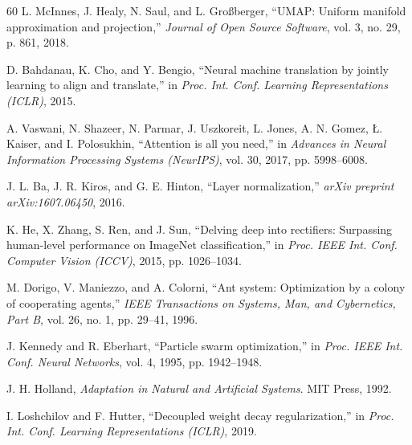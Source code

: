 \documentclass[10pt,a4paper,twocolumn]{article}
\begin{document}
\begin{thebibliography}{60}
 L. McInnes, J. Healy, N. Saul, and L. Gro\ss{}berger, ``UMAP: Uniform manifold approximation and projection,'' \textit{Journal of Open Source Software}, vol. 3, no. 29, p. 861, 2018.

 D. Bahdanau, K. Cho, and Y. Bengio, ``Neural machine translation by jointly learning to align and translate,'' in \textit{Proc. Int. Conf. Learning Representations (ICLR)}, 2015.

 A. Vaswani, N. Shazeer, N. Parmar, J. Uszkoreit, L. Jones, A. N. Gomez, \L{}. Kaiser, and I. Polosukhin, ``Attention is all you need,'' in \textit{Advances in Neural Information Processing Systems (NeurIPS)}, vol. 30, 2017, pp. 5998--6008.

 J. L. Ba, J. R. Kiros, and G. E. Hinton, ``Layer normalization,'' \textit{arXiv preprint arXiv:1607.06450}, 2016.

 K. He, X. Zhang, S. Ren, and J. Sun, ``Delving deep into rectifiers: Surpassing human-level performance on ImageNet classification,'' in \textit{Proc. IEEE Int. Conf. Computer Vision (ICCV)}, 2015, pp. 1026--1034.

 M. Dorigo, V. Maniezzo, and A. Colorni, ``Ant system: Optimization by a colony of cooperating agents,'' \textit{IEEE Transactions on Systems, Man, and Cybernetics, Part B}, vol. 26, no. 1, pp. 29--41, 1996.

 J. Kennedy and R. Eberhart, ``Particle swarm optimization,'' in \textit{Proc. IEEE Int. Conf. Neural Networks}, vol. 4, 1995, pp. 1942--1948.

 J. H. Holland, \textit{Adaptation in Natural and Artificial Systems}. MIT Press, 1992.

 I. Loshchilov and F. Hutter, ``Decoupled weight decay regularization,'' in \textit{Proc. Int. Conf. Learning Representations (ICLR)}, 2019.

\end{thebibliography}
\end{document}
